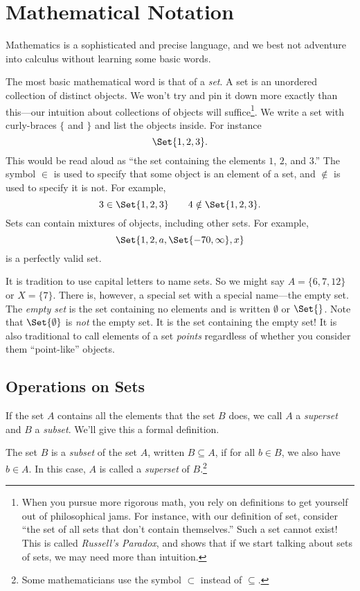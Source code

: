 \section{Mathematical Notation}
	Mathematics is a sophisticated and precise language, and
	we best not adventure into calculus without learning some
	basic words.

	The most basic mathematical word is that of a \emph{set}.  
	A set is an unordered collection of distinct objects.  We won't try and pin
	it down more exactly than this---our intuition about collections
	of objects will suffice\footnote{ When you pursue more rigorous math,
	you rely on definitions to get yourself out of philosophical jams.  For instance,
	with our definition of set, consider ``the set of all sets that don't
	contain themselves.''  Such a set cannot exist!
	This is called \emph{Russell's Paradox}, and shows
	that if we start talking about sets of sets, we may need more than
	intuition.}. We write a set with curly-braces $\{$ and $\}$ and
	list the objects inside.  For instance
	\[
		\Set{1,2,3}.
	\]
	This would be read aloud as ``the set containing the elements $1$, $2$, and $3$.''
	The symbol $\in$\index{$\in$} is used to specify that some object is an element of a set, and
	$\notin$ is used to specify it is not.  For example,
	\[
		3\in\Set{1,2,3}\qquad 4\notin\Set{1,2,3}.
	\]
	Sets can contain mixtures of objects, including other sets.  For example,
	\[
		\Set{1,2,a,\Set{-70,\infty}, x}
	\]
	is a perfectly valid set.

	It is tradition to use capital letters to name sets.  So we might say $A=\{6,7,12\}$
	or $X=\{7\}$.  There is, however, a special set with a special name---the
	empty set.  The \emph{empty set} is the set containing no elements
	and is written $\emptyset$ or $\Set{}$.  Note that $\Set{\emptyset}$ is \emph{not}
	the empty set.  It is the set containing the empty set!  It is also traditional
	to call elements of a set \emph{points} regardless of whether you
	consider them ``point-like'' objects.

	\subsection{Operations on Sets}
	If the set $A$ contains all the elements that the set $B$ does, we call $A$ a \emph{superset}
	and $B$ a \emph{subset}.  We'll give this a formal
	definition.
	\begin{definition}
		The set $B$ is a \emph{subset} of the set $A$, written $B\subseteq A$, if for all
		$b\in B$, we also have $b\in A$.  In this case, $A$ is called a \emph{superset}
		of $B$.\footnote{
			Some mathematicians use the symbol $\subset$ instead of $\subseteq$.}
	\end{definition}

